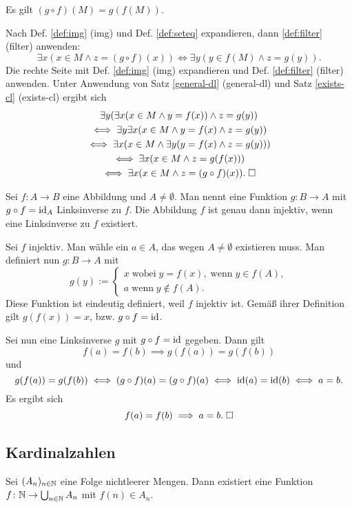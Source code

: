 \begin{Satz}
Es gilt $(g\circ f)(M) = g(f(M))$.
\end{Satz}
\begin{Beweis}
Nach Def. \ref{def:img} (img) und Def. \ref{def:seteq} expandieren,
dann \ref{def:filter} (filter) anwenden:%
\[\exists x(x\in M\land z=(g\circ f)(x))
\iff \exists y(y\in f(M)\land z=g(y)).\]
Die rechte Seite mit Def. \ref{def:img} (img) expandieren und
Def. \ref{def:filter} (filter) anwenden. Unter Anwendung von
Satz \ref{general-dl} (general-dl) und Satz \ref{exists-cl} (exists-cl)
ergibt sich
\begin{gather*}
\exists y(\exists x(x\in M\land y=f(x))\land z=g(y))\\
\iff \exists y\exists x(x\in M\land y=f(x)\land z=g(y))\\
\iff \exists x(x\in M\land\exists y(y=f(x)\land z=g(y)))\\
\iff \exists x(x\in M\land z=g(f(x)))\\
\iff \exists x(x\in M\land z=(g\circ f)(x)).\;\square
\end{gather*}
\end{Beweis}

\begin{Satz}
Sei $f\colon A\to B$ eine Abbildung und $A\ne\emptyset$. Man nennt
eine Funktion $g\colon B\to A$ mit $g\circ f=\operatorname{id}_A$ Linksinverse
zu $f$. Die Abbildung $f$ ist genau dann injektiv, wenn eine
Linksinverse zu $f$ existiert.
\end{Satz}
\begin{Beweis}
Sei $f$ injektiv. Man wähle ein $a\in A$, das wegen $A\ne\emptyset$
existieren muss. Man definiert nun $g\colon B\to A$ mit
\[g(y):=\begin{cases}
x\;\text{wobei}\;y=f(x),\;\text{wenn}\;y\in f(A),\\
a\;\text{wenn}\;y\notin f(A).
\end{cases}\]
Diese Funktion ist eindeutig definiert, weil $f$ injektiv ist.
Gemäß ihrer Definition gilt $g(f(x))=x$, bzw. $g\circ f = \operatorname{id}$.

Sei nun eine Linksinverse $g$ mit $g\circ f=\operatorname{id}$ gegeben. Dann gilt
\[f(a)=f(b) \implies g(f(a))=g(f(b))\]
und
\[g(f(a))=g(f(b))
\iff (g\circ f)(a)=(g\circ f)(a)
\iff \operatorname{id}(a)=\operatorname{id}(b)
\iff a=b.\]
Es ergibt sich
\[f(a)=f(b)\implies a=b.\;\square\]
\end{Beweis}

\newpage
\subsection{Kardinalzahlen}
\begin{Satz}\label{acc}%
Sei $(A_n)_{n\in\mathbb N}$ eine Folge nichtleerer Mengen.
Dann existiert eine Funktion $f\colon\mathbb N\to\bigcup_{n\in\mathbb N} A_n$
mit $f(n)\in A_n$.
\end{Satz}

